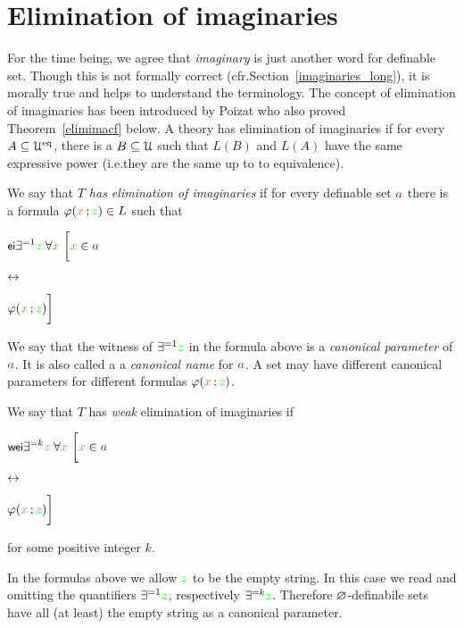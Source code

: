 \documentclass[creche.tex]{subfiles}
\begin{document}
\section{Elimination of imaginaries}\label{elimination_imaginaries}

\def\medrel#1{\parbox[t]{5ex}{$\displaystyle\hfil #1$}}
\def\ceq#1#2#3{\parbox[t]{30ex}{$\displaystyle #1$}\medrel{#2}{$\displaystyle #3$}}

For the time being, we agree that \textit{imaginary\/} is just another word for definable set. Though this is not formally correct (cfr.\@ Section~\ref{imaginaries_long}), it is morally true and helps to understand the terminology. The concept of elimination of imaginaries has been introduced by Poizat who also proved Theorem~\ref{elimimacf} below. A theory has elimination of imaginaries if for every $A\subseteq\EuScript U^{{\rm eq}}$, there is a $B\subseteq\EuScript U$ such that $L(B)$ and $L(A)$ have the same expressive power (i.e.\@ they are the same up to to equivalence).  

\begin{definition}\label{defelimanazioneimmaginari}
We say that \emph{$T$ has elimination of imaginaries\/} if for every definable set ${\color{violet} a}$ there is a formula $\varphi({\color{brown} x}\,;{\color{green} z})\in L$ such that\smallskip

\ceq{\ssf{ei}\hfill\E^{=1} {\gr z}\;\A {\mr x}\ \bigg[{\mr x}\in{\vl a}}{\iff}{\phi({\mr x}\,;{\gr z})\bigg]}

We say that the witness of $\exists^{=1}{\color{green} z}$ in the formula above is a \emph{canonical parameter\/} of ${\color{violet} a}$. It is also called a a \emph{canonical name\/} for ${\color{violet} a}$. A set may have different canonical parameters for different formulas $\varphi({\color{brown} x}\,;{\color{green} z})$.

We say that $T$ has \emph{weak\/} elimination of imaginaries if\smallskip

\ceq{\ssf{wei}\hfill\E^{=k} {\gr z}\;\A {\mr x}\ \bigg[{\mr x}\in{\vl a}}{\iff}{\phi({\mr x}\,;{\gr z})\bigg]}

for some positive integer $k$.\QED
\end{definition}

In the formulas above we allow ${\color{green} z}$ to be the empty string. In this case we read  and  omitting the quantifiers $\exists^{=1}{\color{green} z}$, respectively $\exists^{=k}{\color{green} z}$. Therefore $\varnothing$-definabile sets have all (at least) the empty string as a canonical parameter.
\end{document}
